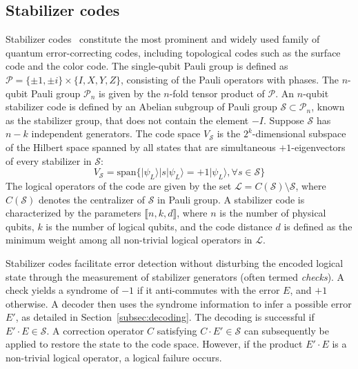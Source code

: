 \documentclass[%
 reprint,
 amsmath,amssymb,
 aps,
]{revtex4-2}
\begin{document}
\subsection{Stabilizer codes}
Stabilizer codes~\cite{gottesman1998theory} constitute the most prominent and widely used family of quantum error-correcting codes, including topological codes such as the surface code and the color code. 
The single-qubit Pauli group is defined as $\mathcal{P}=\{\pm1,\pm i\}\times\{I,X,Y,Z\}$, consisting of the Pauli operators with phases. 
The $n$-qubit Pauli group $\mathcal{P}_n$ is given by the $n$-fold tensor product of $\mathcal{P}$. An $n$-qubit stabilizer code is defined by an Abelian subgroup of Pauli group $\mathcal{S}\subset \mathcal{P}_n$, known as the stabilizer group, that does not contain the element $-I$. Suppose $\mathcal{S}$ has $n-k$ independent generators. The code space $V_\mathcal{S}$ is the $2^k$-dimensional subspace of the Hilbert space spanned by all states that are simultaneous $+1$-eigenvectors of every stabilizer in $\mathcal{S}$:
\begin{equation}
    V_\mathcal{S}=\text{span}\{\vert\psi_L\rangle|s|\psi_L\rangle=+1|\psi_L\rangle,\forall s\in \mathcal{S}\}
\end{equation}
The logical operators of the code are given by the set $\mathcal{L} = C(\mathcal{S}) \setminus \mathcal{S}$, where $C(\mathcal{S})$ denotes the centralizer of $\mathcal{S}$ in Pauli group. A stabilizer code is characterized by the parameters $\llbracket n,k,d \rrbracket$, where $n$ is the number of physical qubits, $k$ is the number of logical qubits, and the code distance $d$ is defined as the minimum weight among all non-trivial logical operators in $\mathcal{L}$.

Stabilizer codes facilitate error detection without disturbing the encoded logical state through the measurement of stabilizer generators (often termed \textit{checks}). 
A check yields a syndrome of $-1$ if it anti-commutes with the error $E$, and $+1$ otherwise.
A decoder then uses the syndrome information to infer a possible error $E'$, as detailed in Section~\ref{subsec:decoding}. The decoding is successful if $E'\cdot E\in \mathcal{S}$. A correction operator $C$ satisfying $C\cdot E' \in \mathcal{S}$ can subsequently be applied to restore the state to the code space. However, if the product $E' \cdot E$ is a non-trivial logical operator, a logical failure occurs.
\end{document}

